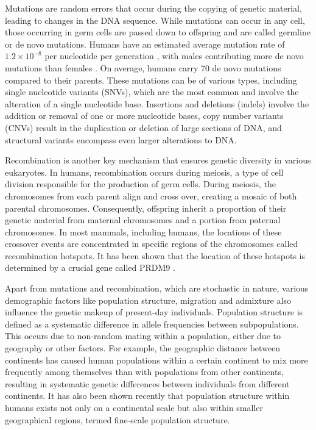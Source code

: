 Mutations are random errors that occur during the copying of genetic material, leading to changes in the DNA sequence. While mutations can occur in any cell, those occurring in germ cells are passed down to offspring and are called germline or de novo mutations. Humans have an estimated average mutation rate of $1.2 \times 10^{-8}$ per nucleotide per generation \cite{Kong2012}, with males contributing more de novo mutations than females \cite{Harris2019}. On average, humans carry 70 de novo mutations compared to their parents. These mutations can be of various types, including single nucleotide variants (SNVs), which are the most common and involve the alteration of a single nucleotide base. Insertions and deletions (indels) involve the addition or removal of one or more nucleotide bases, copy number variants (CNVs) result in the duplication or deletion of large sections of DNA, and structural variants encompass even larger alterations to DNA.

Recombination is another key mechanism that ensures genetic diversity in various eukaryotes. In humans, recombination occurs during meiosis, a type of cell division responsible for the production of germ cells. During meiosis, the chromosomes from each parent align and cross over, creating a mosaic of both parental chromosomes. Consequently, offspring inherit a proportion of their genetic material from maternal chromosomes and a portion from paternal chromosomes. In most mammals, including humans, the locations of these crossover events are concentrated in specific regions of the chromosomes called recombination hotspots. It has been shown that the location of these hotspots is determined by a crucial gene called PRDM9 \cite{Baudat2010}.

Apart from mutations and recombination, which are stochastic in nature, various demographic factors like population structure, migration and admixture also influence the genetic makeup of present-day individuals. Population structure is defined as a systematic difference in allele frequencies between subpopulations. This occurs due to non-random mating within a population, either due to geography or other factors. For example, the geographic distance between continents has caused human populations within a certain continent to mix more frequently among themselves than with populations from other continents, resulting in systematic genetic differences between individuals from different continents. It has also been shown recently that population structure within humans exists not only on a continental scale but also within smaller geographical regions, termed fine-scale population structure.

